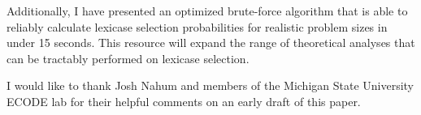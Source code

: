 \documentclass[sigconf]{acmart}
\begin{document}
Additionally, I have presented an optimized brute-force algorithm that is able to reliably calculate lexicase selection probabilities for realistic problem sizes in under 15 seconds. This resource will expand the range of theoretical analyses that can be tractably performed on lexicase selection.

\begin{acks}
I would like to thank Josh Nahum and members of the Michigan State University ECODE lab for their helpful comments on an early draft of this paper.
\end{acks}












\end{document}
